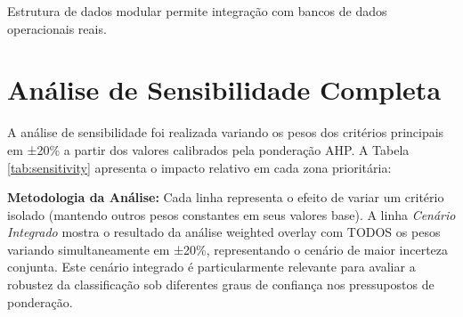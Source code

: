 \documentclass[12pt, a4paper]{article}
\begin{document}
Estrutura de dados modular permite integração com bancos de dados operacionais reais.

\section{Análise de Sensibilidade Completa}

A análise de sensibilidade foi realizada variando os pesos dos critérios principais em ±20\% a partir dos valores calibrados pela ponderação AHP. A Tabela \ref{tab:sensitivity} apresenta o impacto relativo em cada zona prioritária:

\textbf{Metodologia da Análise:} Cada linha representa o efeito de variar um critério isolado (mantendo outros pesos constantes em seus valores base). A linha \textit{Cenário Integrado} mostra o resultado da análise weighted overlay com TODOS os pesos variando simultaneamente em ±20\%, representando o cenário de maior incerteza conjunta. Este cenário integrado é particularmente relevante para avaliar a robustez da classificação sob diferentes graus de confiança nos pressupostos de ponderação.
\end{document}
